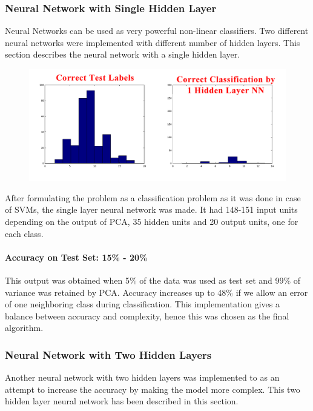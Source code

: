 \documentclass[12pt]{article}
\begin{document}
	
	\subsubsection{Neural Network with Single Hidden Layer}
	Neural Networks can be used as very powerful non-linear classifiers.
	Two different neural networks were implemented with different number
	of hidden layers. This section describes the neural network with a
	single hidden layer.\newline
	
	\begin{figure}[h]
	\includegraphics[width=\textwidth]{CorrectVsNN1}
	\end{figure}
	
	After formulating the problem as a classification problem as it was
	done in case of SVMs, the single layer neural network was made. It
	had 148-151 input units depending on the output of PCA, 35 hidden
	units and 20 output units, one for each class.
	
	\paragraph{Accuracy on Test Set: 15\% - 20\%\newline}
	
	This output was obtained when 5\% of the data was used as test set and
	99\% of variance was retained by PCA.
	Accuracy increases up to 48\% if we allow an error of one neighboring
	class during classification. This implementation gives a balance between
	accuracy and complexity, hence this was chosen as the final algorithm.	
	
	
	\subsubsection{Neural Network with Two Hidden Layers}
	Another neural network with two hidden layers was implemented to as
	an attempt to increase the accuracy by making the model more complex.
	This two hidden layer neural network has been described in this section.
	\newline
	
\end{document}
